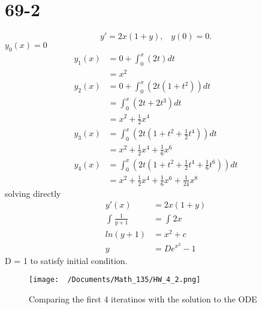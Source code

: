 \documentclass{article}
\begin{document}
    \section{69-2}
    \[
    y'=2x(1+y), \; \; \; y(0) = 0
    .\] 
    $y_0(x) = 0$
    \begin{align*}
        y_1(x) &= 0 + \int_{0}^{x}(2t)dt \\
               &= x^2\\
        y_2(x) &= 0 + \int_{0}^{x}(2t(1+t^2))dt\\
               &= \int_{0}^{x}(2t+2t^3)dt\\
               &= x^2+\frac{1}{2}x^4\\
        y_3(x) &= \int_{0}^{x}(2t(1+t^2+\frac{1}{2}t^{4}))dt\\
               &= x^2+\frac{1}{2}x^{4}+ \frac{1}{6}x^{6}\\
        y_4(x) &= \int_{0}^{x}(2t(1+t^2+\frac{1}{2}t^4+\frac{1}{6}t^6))dt\\
               &= x^2+\frac{1}{2}x^{4}+\frac{1}{6}x^{6}+\frac{1}{24}x^8
    \end{align*}
    solving directly
    \begin{align*}
        y'(x) &= 2x(1+y)\\
        \int_{}^{}\frac{1}{y+1} &= \int_{}^{}2x\\
        ln(y+1) &= x^2+c\\
        y & = De^{x^2}-1
    \end{align*}
    D = 1 to satisfy initial condition.
    \begin{figure}[H]
    \centering
        \texttt{[image: ~/Documents/Math\_135/HW\_4\_2.png]}
        \caption{Comparing the first 4 iteratinos with the solution to the ODE}
        \label{fig:your_label}
    \end{figure}
\end{document}
